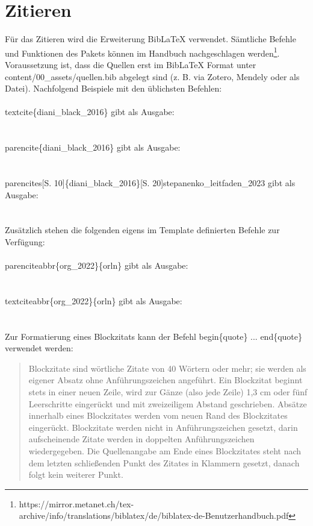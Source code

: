 \section{Zitieren}
Für das Zitieren wird die Erweiterung BibLaTeX verwendet. Sämtliche Befehle und Funktionen des Pakets können im Handbuch nachgeschlagen werden\footnote{https://mirror.metanet.ch/tex-archive/info/translations/biblatex/de/biblatex-de-Benutzerhandbuch.pdf}. Voraussetzung ist, dass die Quellen erst im BibLaTeX Format unter content/00\_assets/quellen.bib abgelegt sind (z. B. via Zotero, Mendely oder als Datei). Nachfolgend Beispiele mit den üblichsten Befehlen:\\
\\
\setminus textcite\{diani\_black\_2016\} gibt als Ausgabe:\\ 
\textcite{diani_black_2016}\\
\\
\setminus parencite\{diani\_black\_2016\} gibt als Ausgabe:\\ 
\parencite{diani_black_2016}\\
\\
\setminus parencites[S. 10]\{diani\_black\_2016\}[S. 20]{stepanenko\_leitfaden\_2023} gibt als Ausgabe:\\ 
\parencites[S. 10]{diani_black_2016}[S. 20]{stepanenko_leitfaden_2023}\\
\\
Zusätzlich stehen die folgenden eigens im Template definierten Befehle zur Verfügung:\\
\\
\setminus parenciteabbr\{org\_2022\}\{orln\} gibt als Ausgabe:\\ 
\\
\\
\setminus textciteabbr\{org\_2022\}\{orln\} gibt als Ausgabe:\\ 
\\
\\
Zur Formatierung eines Blockzitats kann der Befehl \setminus begin\{quote\} ... \setminus end\{quote\} verwendet werden:
\begin{quote}
Blockzitate sind wörtliche Zitate von 40 Wörtern oder mehr; sie werden als eigener Absatz ohne Anführungszeichen angeführt.
Ein Blockzitat beginnt stets in einer neuen Zeile, wird zur Gänze (also jede Zeile) 1,3 cm oder fünf Leerschritte eingerückt und mit zweizeiligem Abstand geschrieben. Absätze innerhalb eines Blockzitates werden vom neuen Rand des Blockzitates eingerückt. Blockzitate werden nicht in Anführungszeichen gesetzt, darin aufscheinende Zitate werden in doppelten Anführungszeichen wiedergegeben. Die Quellenangabe am Ende eines Blockzitates steht nach dem letzten schließenden Punkt des Zitates in Klammern gesetzt, danach folgt kein weiterer Punkt.\\
\parencite[S. 111]{psychologie_richtlinien_2016}
\end{quote}
